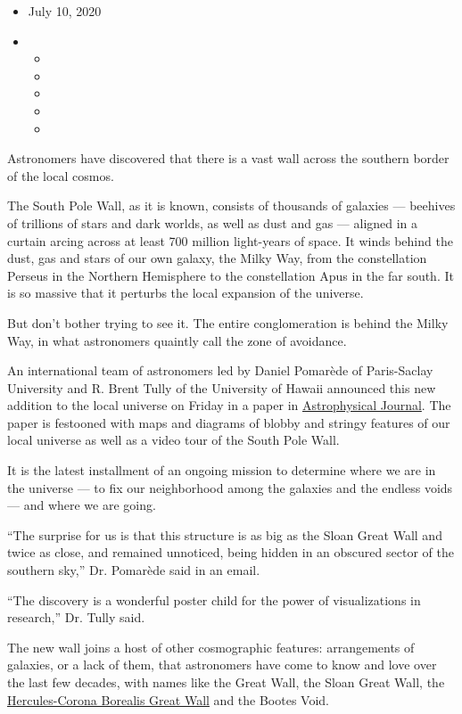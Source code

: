 \begin{itemize}
\item
  July 10, 2020
\item
  \begin{itemize}
  \item
  \item
  \item
  \item
  \item
  \end{itemize}
\end{itemize}

Astronomers have discovered that there is a vast wall across the
southern border of the local cosmos.

The South Pole Wall, as it is known, consists of thousands of galaxies
--- beehives of trillions of stars and dark worlds, as well as dust and
gas --- aligned in a curtain arcing across at least 700 million
light-years of space. It winds behind the dust, gas and stars of our own
galaxy, the Milky Way, from the constellation Perseus in the Northern
Hemisphere to the constellation Apus in the far south. It is so massive
that it perturbs the local expansion of the universe.

But don't bother trying to see it. The entire conglomeration is behind
the Milky Way, in what astronomers quaintly call the zone of avoidance.

An international team of astronomers led by Daniel Pomarède of
Paris-Saclay University and R. Brent Tully of the University of Hawaii
announced this new addition to the local universe on Friday in a paper
in \href{https://doi.org/10.3847/1538-4357/ab9952}{Astrophysical
Journal}. The paper is festooned with maps and diagrams of blobby and
stringy features of our local universe as well as a video tour of the
South Pole Wall.

It is the latest installment of an ongoing mission to determine where we
are in the universe --- to fix our neighborhood among the galaxies and
the endless voids --- and where we are going.

``The surprise for us is that this structure is as big as the Sloan
Great Wall and twice as close, and remained unnoticed, being hidden in
an obscured sector of the southern sky,'' Dr. Pomarède said in an email.

``The discovery is a wonderful poster child for the power of
visualizations in research,'' Dr. Tully said.

The new wall joins a host of other cosmographic features: arrangements
of galaxies, or a lack of them, that astronomers have come to know and
love over the last few decades, with names like the Great Wall, the
Sloan Great Wall, the
\href{https://en.wikipedia.org/wiki/Hercules\%E2\%80\%93Corona_Borealis_Great_Wall}{Hercules-Corona
Borealis Great Wall} and the Bootes Void.

